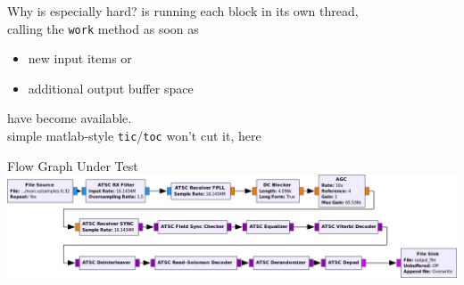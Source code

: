 \begin{frame}{Why is \GR especially hard?}
  \GR is running each block in its own thread,\\
  calling the \texttt{work} method as soon as

  \begin{itemize}
  \item new input items or
  \item additional output buffer space 
  \end{itemize}
  have become available.\\
  \bigskip
  simple matlab-style \texttt{tic}/\texttt{toc} won't cut it, here
\end{frame}

\begin{frame}{Flow Graph Under Test}
  \includegraphics[width=\textwidth]{flowgraph}
\end{frame}

